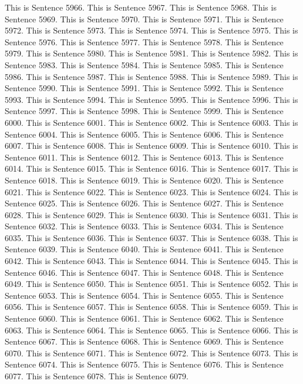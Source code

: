 \documentclass{article}
\begin{document}
This is Sentence 5966.
This is Sentence 5967.
This is Sentence 5968.
This is Sentence 5969.
This is Sentence 5970.
This is Sentence 5971.
This is Sentence 5972.
This is Sentence 5973.
This is Sentence 5974.
This is Sentence 5975.
This is Sentence 5976.
This is Sentence 5977.
This is Sentence 5978.
This is Sentence 5979.
This is Sentence 5980.
This is Sentence 5981.
This is Sentence 5982.
This is Sentence 5983.
This is Sentence 5984.
This is Sentence 5985.
This is Sentence 5986.
This is Sentence 5987.
This is Sentence 5988.
This is Sentence 5989.
This is Sentence 5990.
This is Sentence 5991.
This is Sentence 5992.
This is Sentence 5993.
This is Sentence 5994.
This is Sentence 5995.
This is Sentence 5996.
This is Sentence 5997.
This is Sentence 5998.
This is Sentence 5999.
This is Sentence 6000.
This is Sentence 6001.
This is Sentence 6002.
This is Sentence 6003.
This is Sentence 6004.
This is Sentence 6005.
This is Sentence 6006.
This is Sentence 6007.
This is Sentence 6008.
This is Sentence 6009.
This is Sentence 6010.
This is Sentence 6011.
This is Sentence 6012.
This is Sentence 6013.
This is Sentence 6014.
This is Sentence 6015.
This is Sentence 6016.
This is Sentence 6017.
This is Sentence 6018.
This is Sentence 6019.
This is Sentence 6020.
This is Sentence 6021.
This is Sentence 6022.
This is Sentence 6023.
This is Sentence 6024.
This is Sentence 6025.
This is Sentence 6026.
This is Sentence 6027.
This is Sentence 6028.
This is Sentence 6029.
This is Sentence 6030.
This is Sentence 6031.
This is Sentence 6032.
This is Sentence 6033.
This is Sentence 6034.
This is Sentence 6035.
This is Sentence 6036.
This is Sentence 6037.
This is Sentence 6038.
This is Sentence 6039.
This is Sentence 6040.
This is Sentence 6041.
This is Sentence 6042.
This is Sentence 6043.
This is Sentence 6044.
This is Sentence 6045.
This is Sentence 6046.
This is Sentence 6047.
This is Sentence 6048.
This is Sentence 6049.
This is Sentence 6050.
This is Sentence 6051.
This is Sentence 6052.
This is Sentence 6053.
This is Sentence 6054.
This is Sentence 6055.
This is Sentence 6056.
This is Sentence 6057.
This is Sentence 6058.
This is Sentence 6059.
This is Sentence 6060.
This is Sentence 6061.
This is Sentence 6062.
This is Sentence 6063.
This is Sentence 6064.
This is Sentence 6065.
This is Sentence 6066.
This is Sentence 6067.
This is Sentence 6068.
This is Sentence 6069.
This is Sentence 6070.
This is Sentence 6071.
This is Sentence 6072.
This is Sentence 6073.
This is Sentence 6074.
This is Sentence 6075.
This is Sentence 6076.
This is Sentence 6077.
This is Sentence 6078.
This is Sentence 6079.
\end{document}
